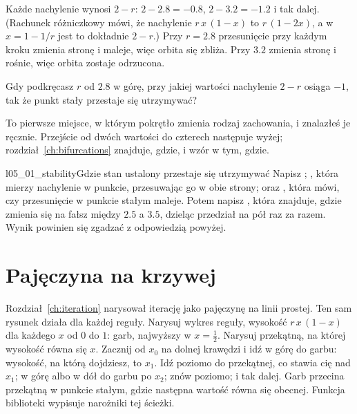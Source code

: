 

\noindent
Każde nachylenie wynosi $2 - r$: $2 - \num{2.8} = \num{-0.8}$,
$2 - \num{3.2} = \num{-1.2}$ i tak dalej. (Rachunek różniczkowy mówi, że
nachylenie $r\,x\,(1 - x)$ to $r\,(1 - 2x)$, a w $x = 1 - 1/r$ jest to
dokładnie $2 - r$.) Przy $r = \num{2.8}$ przesunięcie przy każdym kroku
zmienia stronę i maleje, więc orbita się zbliża. Przy $\num{3.2}$ zmienia
stronę i rośnie, więc orbita zostaje odrzucona.

\begin{think}
Gdy podkręcasz $r$ od $\num{2.8}$ w górę, przy jakiej wartości nachylenie
$2 - r$ osiąga $-1$, tak że punkt stały przestaje się utrzymywać?
\end{think}

\noindent
To pierwsze miejsce, w którym pokrętło zmienia rodzaj zachowania, i
znalazłeś je ręcznie. Przejście od dwóch wartości do czterech następuje
wyżej; rozdział~\ref{ch:bifurcations} znajduje, gdzie, i wzór w tym, gdzie.

\begin{lab}{l05_01_stability}{Gdzie stan ustalony przestaje się utrzymywać}
Napisz ; , która mierzy nachylenie w
punkcie, przesuwając go w obie strony; oraz , która mówi, czy
przesunięcie w punkcie stałym maleje. Potem napisz , która
znajduje, gdzie  zmienia się na fałsz między $\num{2.5}$ a
$\num{3.5}$, dzieląc przedział na pół raz za razem. Wynik powinien się
zgadzać z odpowiedzią powyżej.
\end{lab}

\section{Pajęczyna na krzywej}
\label{sec:ch05-cobweb}

\noindent
Rozdział~\ref{ch:iteration} narysował iterację jako pajęczynę na linii
prostej. Ten sam rysunek działa dla każdej reguły. Narysuj wykres reguły,
wysokość $r\,x\,(1 - x)$ dla każdego $x$ od $0$ do $1$: garb, najwyższy w
$x = \tfrac12$. Narysuj przekątną, na której wysokość równa się $x$. Zacznij
od $x_0$ na dolnej krawędzi i idź w górę do garbu: wysokość, na którą
dojdziesz, to $x_1$. Idź poziomo do przekątnej, co stawia cię nad $x_1$; w
górę albo w dół do garbu po $x_2$; znów poziomo; i tak dalej. Garb przecina
przekątną w punkcie stałym, gdzie następna wartość równa się obecnej.
Funkcja biblioteki  wypisuje narożniki tej ścieżki.

